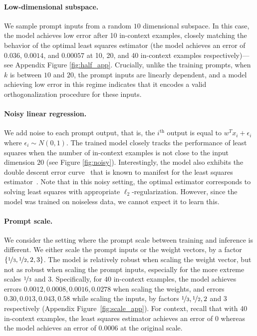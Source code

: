 \paragraph{Low-dimensional subspace.} We sample prompt inputs from a random $10$ dimensional subspace. 
In this case, the model achieves low error after 10 in-context examples,  closely matching the behavior of the optimal least squares estimator (the model achieves an error of $0.036$, $0.0014$, and $0.00057$ at 10, 20, and 40 in-context examples respectively)---see Appendix Figure \ref{fig:half_app}.
Crucially, unlike the training prompts, when $k$ is between $10$ and $20$, the prompt inputs are linearly dependent, and a model  achieving low error in this regime indicates that it encodes a valid orthogonalization procedure for these inputs.

\paragraph{Noisy linear regression.} We add noise to each prompt output, that is, the $i^{\text{th}}$ output is equal to $w^T x_i + \epsilon_i$ where $\epsilon_i \sim N(0, 1)$.
The trained model closely tracks the performance of least squares when the number of in-context examples is not close to the input dimension $20$ (see Figure \ref{fig:noisy}). 
Interestingly, the model also exhibits the double descent error curve~\citep{belkin2019reconciling}  that is known to manifest for the least squares estimator~\citep{nakkiran2019more}.
Note that in this noisy setting, the optimal estimator corresponds to solving least squares with appropriate $\ell_2$-regularization. However, since the model was trained on noiseless data, we cannot expect it to learn this.

\paragraph{Prompt scale.} We consider the setting where the prompt scale between training and inference is different. We either scale the prompt inputs or the weight vectors, by a factor $\{\nicefrac{1}{3}, \nicefrac{1}{2},  2, 3\}$.
The model is relatively robust when scaling the weight vector, but not as robust when scaling the prompt inputs, especially for the more extreme scales $\nicefrac{1}{3}$ and $3$.
Specifically, for $40$ in-context examples, the model achieves errors $0.0012,0.0008,0.0016,0.0278$ when scaling the weights, and errors $0.30,0.013,0.043,0.58$ while scaling the inputs, by factors $\nicefrac{1}{3}, \nicefrac{1}{2},  2$ and $3$ respectively (Appendix Figure~\ref{fig:scale_app}). For context, recall that with 40 in-context examples, the least squares  estimator achieves an error of $0$ whereas the model achieves an error of $0.0006$ at the original scale.



